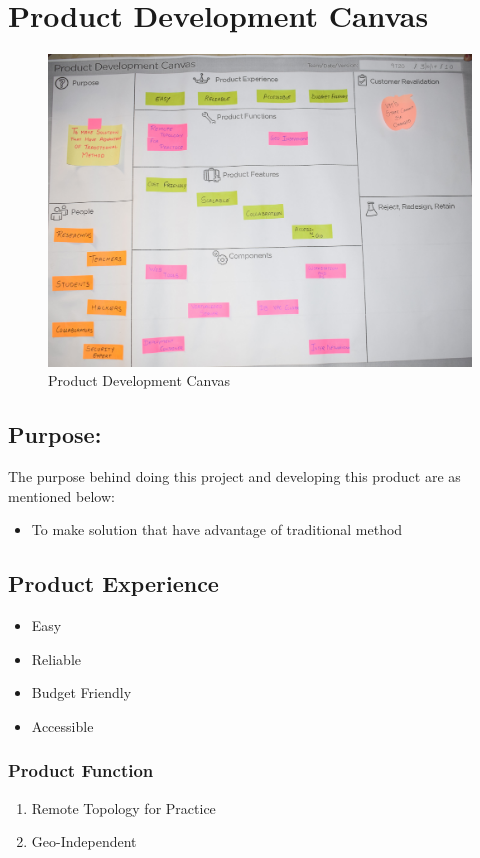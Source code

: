 \documentclass[12pt,a4paper,final,oneside]{report}
\begin{document}
	\section{Product Development Canvas}	
	\begin{figure}[h!]
		\centering
		\includegraphics[width=1.0\linewidth,angle=0]
		{PRODUCT.jpg}
		\caption{Product Development Canvas}
		
	\end{figure}
	\textbf{}
	\noindent \subsection{ Purpose:}
	The purpose behind doing this project and developing this product are as mentioned below:\\
	\textbf{}
	\begin{itemize}
	\item To make solution that have advantage of traditional method
	\end{itemize}
	\subsection{Product Experience}
	\begin{itemize}
	\item Easy
	\item Reliable
	\item Budget Friendly
	\item Accessible
	\end{itemize}
	\subsubsection{Product Function}
	\begin{enumerate}
	\item Remote Topology for Practice
	\item Geo-Independent
	\end{enumerate}
\end{document}
